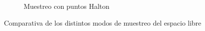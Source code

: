 \begin{figure}[h]
\begin{subfigure}[b]{0.3\textwidth}
                \caption{Muestreo con puntos Halton}
                \label{fig:muestreo_halton}
        \end{subfigure}
        \caption{Comparativa de los distintos modos de muestreo del espacio libre}\label{fig:muestreo}
\end{figure}